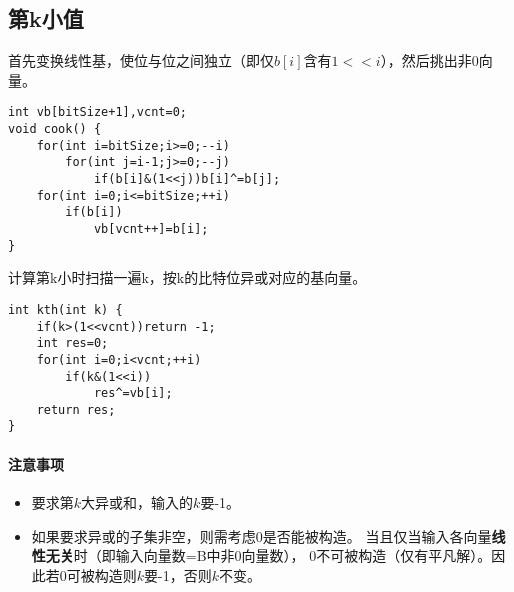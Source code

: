 \subsection{第k小值}
首先变换线性基，使位与位之间独立（即仅$b[i]$含有$1<<i$），然后挑出非0向量。
\begin{lstlisting}
int vb[bitSize+1],vcnt=0;
void cook() {
    for(int i=bitSize;i>=0;--i)
        for(int j=i-1;j>=0;--j)
            if(b[i]&(1<<j))b[i]^=b[j];
    for(int i=0;i<=bitSize;++i)
        if(b[i])
            vb[vcnt++]=b[i];
}
\end{lstlisting}
计算第k小时扫描一遍k，按k的比特位异或对应的基向量。
\begin{lstlisting}
int kth(int k) {
    if(k>(1<<vcnt))return -1;
    int res=0;
    for(int i=0;i<vcnt;++i)
        if(k&(1<<i))
            res^=vb[i];
    return res;
}
\end{lstlisting}

\paragraph{注意事项}
\begin{itemize}
    \item 要求第$k$大异或和，输入的$k$要-1。
    \item 如果要求异或的子集非空，则需考虑$0$是否能被构造。
    当且仅当输入各向量{\bfseries 线性无关}时（即输入向量数=B中非0向量数），
    $0$不可被构造（仅有平凡解）。因此若$0$可被构造则$k$要-1，否则$k$不变。
\end{itemize}
